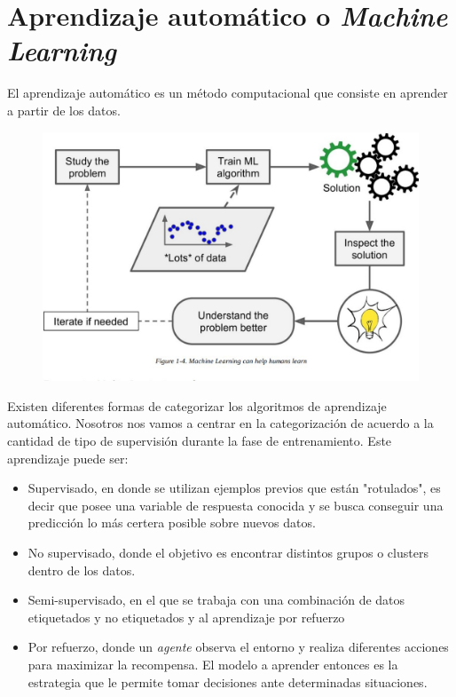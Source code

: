 \section{Aprendizaje automático o \textit{Machine Learning}}
El aprendizaje automático es un método computacional que consiste en aprender a partir de los datos. 





\begin{figure}[H]
    \centering
    \includegraphics[scale=0.25]{documents/latex/figures/2/diagrama_ml.jpg}
    \caption{}
    \label{fig:ml_diagram}
\end{figure}


Existen diferentes formas de categorizar los algoritmos de aprendizaje automático. Nosotros nos vamos a centrar en la categorización de acuerdo a la cantidad de tipo de supervisión durante la fase de entrenamiento. Este aprendizaje puede ser:

\begin{itemize}
\item Supervisado, en donde se utilizan ejemplos previos que están "rotulados", es decir que posee una variable de respuesta conocida y se busca conseguir una predicción lo más certera posible sobre nuevos datos. \item No supervisado, donde el objetivo es encontrar distintos grupos o clusters dentro de los datos.
\item Semi-supervisado, en el que se trabaja con una combinación de datos etiquetados y no etiquetados y al aprendizaje por refuerzo
\item Por refuerzo, donde un \textit{agente} observa el entorno y realiza diferentes acciones para maximizar la recompensa. El modelo a aprender entonces es la estrategia que le permite tomar decisiones ante determinadas situaciones. 
\end{itemize}

